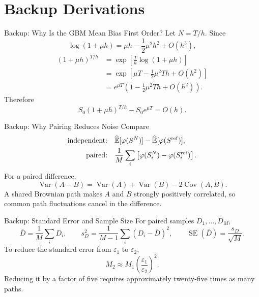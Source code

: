 \documentclass[aspectratio=169,10pt]{beamer}
\newcommand{\E}{\mathbb{E}}
\newcommand{\Var}{\operatorname{Var}}
\begin{document}
\appendix
\section{Backup Derivations}

\begin{frame}{Backup: Why Is the GBM Mean Bias First Order?}
  Let $N=T/h$. Since
  \[
    \log(1+\mu h)=\mu h-\frac12\mu^2h^2+O(h^3),
  \]
  \begin{align*}
    (1+\mu h)^{T/h}
      &=\exp\!\left[\frac{T}{h}\log(1+\mu h)\right]\\
      &=\exp\!\left[\mu T-\frac12\mu^2Th+O(h^2)\right]\\
      &=e^{\mu T}\left(1-\frac12\mu^2Th+O(h^2)\right).
  \end{align*}
  Therefore
  \[
    S_0(1+\mu h)^{T/h}-S_0e^{\mu T}=O(h).
  \]
\end{frame}

\begin{frame}{Backup: Why Pairing Reduces Noise}
  Compare
  \begin{align*}
    \text{independent:}\quad
      &\widehat{\E}[\varphi(S^N)]-\widehat{\E}[\varphi(S^{\rm ref})],\\
    \text{paired:}\quad
      &\frac1M\sum_i\left[\varphi(S_i^N)-\varphi(S_i^{\rm ref})\right].
  \end{align*}
  For a paired difference,
  \[
    \Var(A-B)=\Var(A)+\Var(B)-2\operatorname{Cov}(A,B).
  \]
  A shared Brownian path makes $A$ and $B$ strongly positively correlated,
  so common path fluctuations cancel in the difference.
\end{frame}

\begin{frame}{Backup: Standard Error and Sample Size}
  For paired samples $D_1,\ldots,D_M$,
  \[
    \bar D=\frac1M\sum_iD_i,\qquad
    s_D^2=\frac1{M-1}\sum_i(D_i-\bar D)^2,\qquad
    \operatorname{SE}(\bar D)=\frac{s_D}{\sqrt M}.
  \]
  To reduce the standard error from $\varepsilon_1$ to $\varepsilon_2$,
  \[
    M_2\approx M_1\left(\frac{\varepsilon_1}{\varepsilon_2}\right)^2.
  \]
  Reducing it by a factor of five requires approximately twenty-five times as many paths.
\end{frame}
\end{document}
